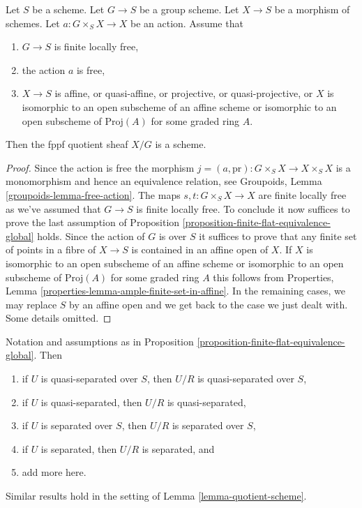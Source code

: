 \begin{lemma}
\label{lemma-quotient-scheme}
Let $S$ be a scheme. Let $G \to S$ be a group scheme. Let $X \to S$ be
a morphism of schemes. Let $a : G \times_S X \to X$ be an action. Assume that
\begin{enumerate}
\item $G \to S$ is finite locally free,
\item the action $a$ is free,
\item $X \to S$ is affine, or quasi-affine, or projective, or
quasi-projective, or $X$ is isomorphic to an open subscheme of an
affine scheme or isomorphic to an open subscheme of $\text{Proj}(A)$
for some graded ring $A$.
\end{enumerate}
Then the fppf quotient sheaf $X/G$ is a scheme.
\end{lemma}

\begin{proof}
Since the action is free the morphism
$j = (a, \text{pr}) : G \times_S X \to X \times_S X$
is a monomorphism and hence an equivalence relation, see
Groupoids, Lemma \ref{groupoids-lemma-free-action}. The maps
$s, t : G \times_S X \to X$
are finite locally free as we've assumed that $G \to S$ is finite locally
free. To conclude it now suffices to prove the last assumption of
Proposition \ref{proposition-finite-flat-equivalence-global} holds.
Since the action of $G$ is over $S$ it suffices to prove that
any finite set of points in a fibre of $X \to S$ is contained in an
affine open of $X$. If $X$ is isomorphic to an open subscheme of an
affine scheme or isomorphic to an open subscheme of $\text{Proj}(A)$
for some graded ring $A$ this follows from
Properties, Lemma \ref{properties-lemma-ample-finite-set-in-affine}.
In the remaining cases, we may replace $S$ by an affine open and we
get back to the case we just dealt with. Some details omitted.
\end{proof}

\begin{lemma}
\label{lemma-quotient-separated}
Notation and assumptions as in
Proposition \ref{proposition-finite-flat-equivalence-global}. Then
\begin{enumerate}
\item if $U$ is quasi-separated over $S$, then $U/R$ is quasi-separated
over $S$,
\item if $U$ is quasi-separated, then $U/R$ is quasi-separated,
\item if $U$ is separated over $S$, then $U/R$ is separated over $S$,
\item if $U$ is separated, then $U/R$ is separated, and
\item add more here.
\end{enumerate}
Similar results hold in the setting of Lemma \ref{lemma-quotient-scheme}.
\end{lemma}

